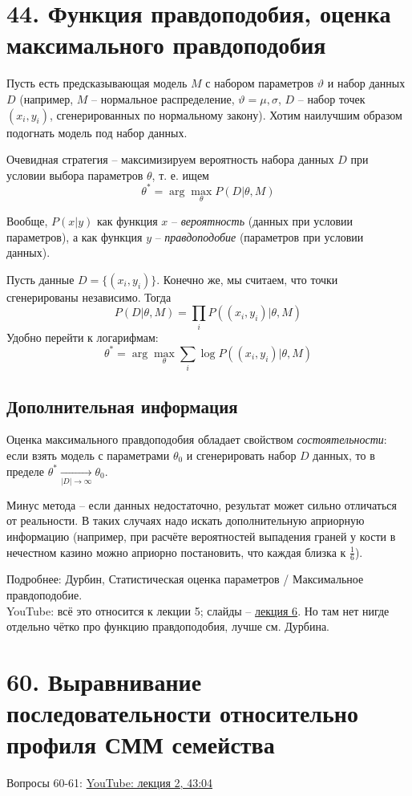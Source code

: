 \documentclass[a4paper,12pt]{article} %
\begin{document}
\section{44. Функция правдоподобия, оценка максимального правдоподобия}

Пусть есть предсказывающая модель $M$ с набором параметров $\vartheta$ и набор данных $D$ (например, $M$ -- нормальное распределение, $\vartheta = {\mu, \sigma}$, $D$ -- набор точек ${(x_i, y_i)}$, сгенерированных по нормальному закону). Хотим наилучшим образом подогнать модель под набор данных.

Очевидная стратегия -- максимизируем вероятность набора данных $D$ при условии выбора параметров $\theta$, т. е. ищем
$$\theta^* = \arg \max_{\theta}P(D|\theta, M)$$

Вообще, $P(x|y)$ как функция $x$ -- \textit{вероятность} (данных при условии параметров), а как функция $y$ -- \textit{правдоподобие} (параметров при условии данных).

Пусть данные $D = \{(x_i, y_i)\}$. Конечно же, мы считаем, что точки сгенерированы независимо. Тогда
$$P(D|\theta, M) = \prod_{i}P((x_i, y_i)|\theta, M)$$
Удобно перейти к логарифмам:
$$\theta^* = \arg \max_\theta \sum_{i} \log P((x_i, y_i) | \theta, M)$$

\subsection{Дополнительная информация}
Оценка максимального правдоподобия обладает свойством \textit{состоятельности}: если взять модель с параметрами $\theta_0$ и сгенерировать набор $D$ данных, то в пределе $\theta^* \xrightarrow[|D| \to \infty]{} \theta_0$.

Минус метода -- если данных недостаточно, результат может сильно отличаться от реальности. В таких случаях надо искать дополнительную априорную информацию (например, при расчёте вероятностей выпадения граней у кости в нечестном казино можно априорно постановить, что каждая близка к $\frac{1}{6}$).

Подробнее: Дурбин,  Статистическая оценка параметров / Максимальное правдоподобие. \\
YouTube: всё это относится к лекции 5; слайды -- \href{https://vk.com/doc155237002_582644273?hash=fb93b84e1043bdc4db}{лекция 6}. Но там нет нигде отдельно чётко про функцию правдоподобия, лучше см. Дурбина.

\section{60. Выравнивание последовательности относительно профиля СММ семейства}
Вопросы 60-61: \href{https://www.youtube.com/watch?v=HD_VI41SmV4&list=PLvJPYisgz4MDD0mcjf9HBu9OX-gb-7WZc&t=2584s}{YouTube: лекция 2, 43:04}
\end{document}
